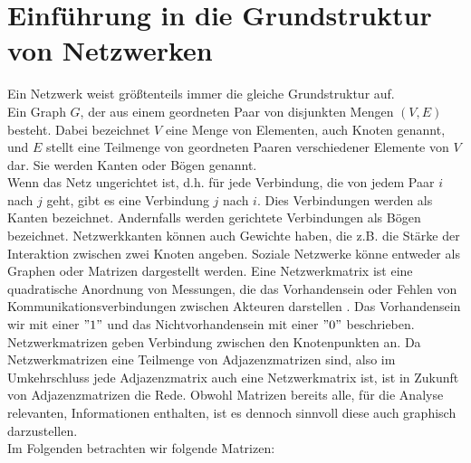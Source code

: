 \section{Einführung in die Grundstruktur von Netzwerken}
Ein Netzwerk weist größtenteils immer die gleiche Grundstruktur auf.\\
Ein Graph $G$, der aus einem
geordneten Paar von disjunkten Mengen $(V ,E)$ besteht. Dabei bezeichnet $V$ eine Menge von Elementen, auch Knoten genannt, und $E$ stellt eine Teilmenge von geordneten Paaren verschiedener Elemente von $V$ dar. Sie werden Kanten oder Bögen genannt.\\
Wenn das Netz ungerichtet ist, d.h. für jede Verbindung, die von jedem Paar $i$ nach $j$ geht, gibt es eine Verbindung $j$ nach $i$. Dies Verbindungen werden als Kanten bezeichnet. Andernfalls werden gerichtete Verbindungen
als Bögen bezeichnet. Netzwerkkanten können auch Gewichte haben, die z.B. die Stärke der Interaktion zwischen zwei Knoten angeben.
Soziale Netzwerke könne entweder als Graphen oder Matrizen dargestellt werden. Eine Netzwerkmatrix ist eine quadratische Anordnung von Messungen, die das Vorhandensein oder Fehlen von Kommunikationsverbindungen zwischen Akteuren darstellen \cite{Hanneman}. Das Vorhandensein wir mit einer $"1"$ und das Nichtvorhandensein mit einer $"0"$ beschrieben. Netzwerkmatrizen geben Verbindung zwischen den Knotenpunkten an. Da Netzwerkmatrizen eine Teilmenge von Adjazenzmatrizen sind, also im Umkehrschluss jede Adjazenzmatrix auch eine Netzwerkmatrix ist, ist in Zukunft von Adjazenzmatrizen die Rede. Obwohl Matrizen bereits alle, für die Analyse relevanten, Informationen enthalten, ist es dennoch sinnvoll diese auch graphisch darzustellen. \\
Im Folgenden betrachten wir folgende Matrizen: \\
 
